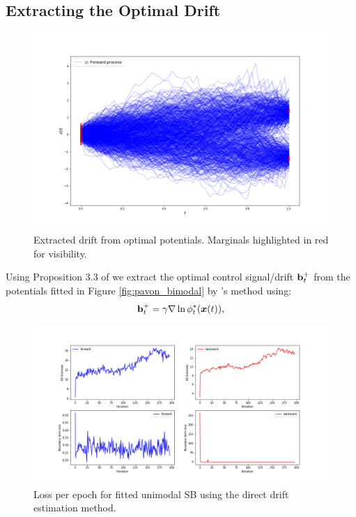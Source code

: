 \documentclass[a4paper,12pt,twoside,openright]{report}
\theoremstyle{definition}
\begin{document}
\subsection{Extracting the Optimal Drift}
\begin{figure}[t]
    \centering
    \includegraphics[scale=0.45,trim={2.3cm 1cm 2.5cm 0}, clip]{images/Pavon/pavon_trajectories_bimodal.png} 
    \caption{Extracted drift from optimal potentials. Marginals highlighted in red for visibility. }
    \label{fig:pavon_bimodal_drift}
\end{figure}
Using Proposition 3.3 of \cite{pavon1991free} we extract the optimal control signal/drift ${\mathbf{b}}_t^+$ from the potentials fitted in Figure \ref{fig:pavon_bimodal} by \cite{pavon2018data}'s method using: 
\begin{align*} 
    {\mathbf{b}}_t^{+} = \gamma \nabla \ln \phi^*_t({\bm{x}}(t) ),
\end{align*}
\begin{figure}
    \centering
    \includegraphics[scale=0.4,trim={2.3cm 1cm 2.5cm 0}, clip]{images/GP/SB_gp_bigvar_epochs_samp_200.png}
    \caption{Loss per epoch for fitted unimodal SB using the direct drift estimation method. }
    \label{fig:epochsbigvargp}
\end{figure}
\end{document}
